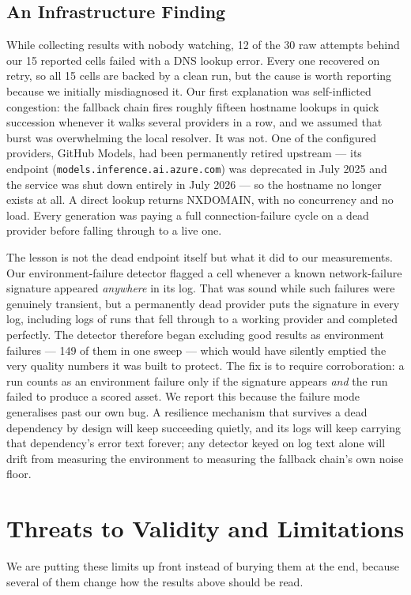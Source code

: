 \documentclass[conference]{IEEEtran}
\begin{document}
\subsection{An Infrastructure Finding}
\label{sec:dns}
While collecting results with nobody watching, 12 of the 30 raw attempts behind our 15 reported cells failed with a DNS lookup error. Every one recovered on retry, so all 15 cells are backed by a clean run, but the cause is worth reporting because we initially misdiagnosed it. Our first explanation was self-inflicted congestion: the fallback chain fires roughly fifteen hostname lookups in quick succession whenever it walks several providers in a row, and we assumed that burst was overwhelming the local resolver. It was not. One of the configured providers, GitHub Models, had been permanently retired upstream --- its endpoint (\texttt{models.inference.ai.azure.com}) was deprecated in July 2025 and the service was shut down entirely in July 2026 --- so the hostname no longer exists at all. A direct lookup returns NXDOMAIN, with no concurrency and no load. Every generation was paying a full connection-failure cycle on a dead provider before falling through to a live one.

The lesson is not the dead endpoint itself but what it did to our measurements. Our environment-failure detector flagged a cell whenever a known network-failure signature appeared \emph{anywhere} in its log. That was sound while such failures were genuinely transient, but a permanently dead provider puts the signature in every log, including logs of runs that fell through to a working provider and completed perfectly. The detector therefore began excluding good results as environment failures --- 149 of them in one sweep --- which would have silently emptied the very quality numbers it was built to protect. The fix is to require corroboration: a run counts as an environment failure only if the signature appears \emph{and} the run failed to produce a scored asset. We report this because the failure mode generalises past our own bug. A resilience mechanism that survives a dead dependency by design will keep succeeding quietly, and its logs will keep carrying that dependency's error text forever; any detector keyed on log text alone will drift from measuring the environment to measuring the fallback chain's own noise floor.

\section{Threats to Validity and Limitations}
\label{sec:limits}
We are putting these limits up front instead of burying them at the end, because several of them change how the results above should be read.
\end{document}

